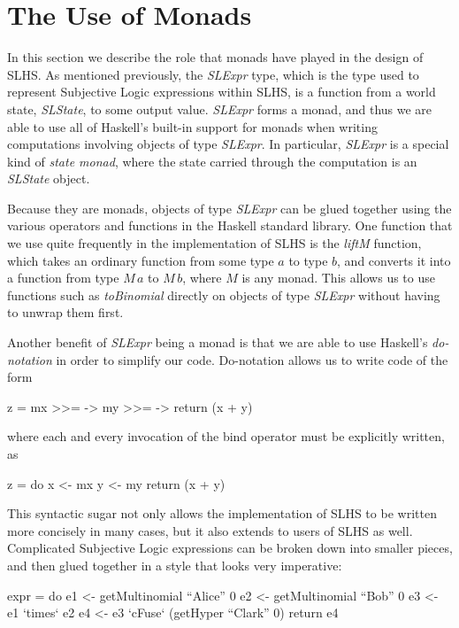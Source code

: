 \documentclass[thesis.tex]{subfiles}
\begin{document}
\section{The Use of Monads}
\label{sec:monads}

In this section we describe the role that monads have played in the design of SLHS. As mentioned
previously, the \emph{SLExpr} type, which is the type used to represent Subjective Logic expressions within SLHS, is a function from
a world state, \emph{SLState}, to some output value. \emph{SLExpr} forms a monad, and thus we are
able to use all of Haskell's built-in support for monads when writing computations involving
objects of type \emph{SLExpr}. In particular, \emph{SLExpr} is a special kind of \emph{state monad},
where the state carried through the computation is an \emph{SLState} object.

Because they are monads, objects of type \emph{SLExpr} can be glued together using the various
operators and functions in the Haskell standard library. One function that we use quite frequently
in the implementation of SLHS is the \emph{liftM} function, which takes an ordinary function from
some type $a$ to type $b$, and converts it into a function from type $M\,a$ to $M\,b$, where $M$ is
any monad. This allows us to use functions such as \emph{toBinomial} directly on objects of type
\emph{SLExpr} without having to unwrap them first.

Another benefit of \emph{SLExpr} being a monad is that we are able to use Haskell's \emph{do-notation}
in order to simplify our code. Do-notation allows us to write code of the form

\begin{spec}
z = mx >>= \x -> my >>= \y -> return (x + y)
\end{spec}

where each and every invocation of the bind operator must be explicitly written, as

\begin{spec}
z = do x <- mx
       y <- my
       return (x + y)
\end{spec}

This syntactic sugar not only allows the implementation of SLHS to be written more
concisely in many cases, but it also extends to users of SLHS as well. Complicated
Subjective Logic expressions can be broken down into smaller pieces, and then glued
together in a style that looks very imperative:

\begin{spec}
expr = do e1 <- getMultinomial ``Alice'' 0
          e2 <- getMultinomial ``Bob'' 0
          e3 <- e1 `times` e2
          e4 <- e3 `cFuse` (getHyper ``Clark'' 0)
          return e4
\end{spec}
\end{document}
